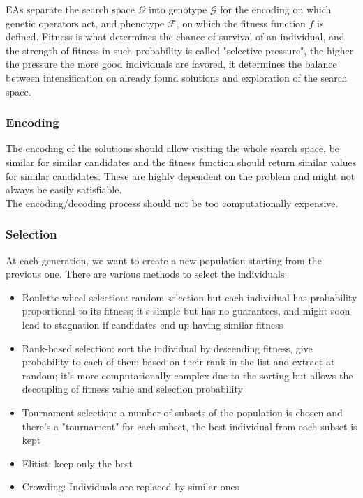 EAs separate the search space $\Omega$ into genotype $\mathcal{G}$ for the encoding on which genetic operators act, and phenotype $\mathcal{F}$, on which the fitness function $f$ is defined. Fitness is what determines the chance of survival of an individual, and the strength of fitness in such probability is called "selective pressure", the higher the pressure the more good individuals are favored, it determines the balance between intensification on already found solutions and exploration of the search space.\\

\subsubsection{Encoding}
The encoding of the solutions should allow visiting the whole search space, be similar for similar candidates and the fitness function should return similar values for similar candidates. These are highly dependent on the problem and might not always be easily satisfiable.\\
The encoding/decoding process should not be too computationally expensive.\\

\subsubsection{Selection}
At each generation, we want to create a new population starting from the previous one. There are various methods to select the individuals:
\begin{itemize}
	\item Roulette-wheel selection: random selection but each individual has probability proportional to its fitness; it's simple but has no guarantees, and might soon lead to stagnation if candidates end up having similar fitness
	\item Rank-based selection: sort the individual by descending fitness, give probability to each of them based on their rank in the list and extract at random; it's more computationally complex due to the sorting but allows the decoupling of fitness value and selection probability
	\item Tournament selection: a number of subsets of the population is chosen and there's a "tournament" for each subset, the best individual from each subset is kept
	\item Elitist: keep only the best
	\item Crowding: Individuals are replaced by similar ones
\end{itemize}

